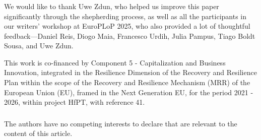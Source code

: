 \documentclass[runningheads]{llncs}
\begin{document}
\begin{credits}
\subsubsection{\ackname} We would like to thank Uwe Zdun, who helped us improve this paper significantly through the shepherding process, as well as all the participants in our writers' workshop at EuroPLoP 2025, who also provided a lot of thoughtful feedback---Daniel Reis, Diogo Maia, Francesco Urdih, Julia Pampus, Tiago Boldt Sousa, and Uwe Zdun.

This work is co-financed by Component 5 - Capitalization and Business Innovation, integrated in the Resilience Dimension of the Recovery and Resilience Plan within the scope of the Recovery and Resilience Mechanism (MRR) of the European Union (EU), framed in the Next Generation EU, for the period 2021 - 2026, within project HfPT, with reference 41.

\subsubsection{\discintname}
The authors have no competing interests to declare that are relevant to the content of this article.
\end{credits}



\end{document}
